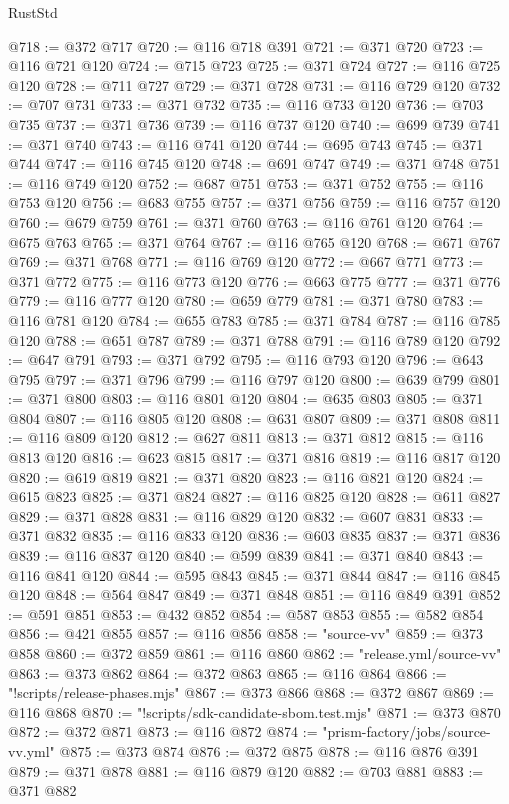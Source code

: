 \begin{lexlean}{RustStd}
\begin{coremodule}
@718 := @372 @717
@720 := @116 @718 @391
@721 := @371 @720
@723 := @116 @721 @120
@724 := @715 @723
@725 := @371 @724
@727 := @116 @725 @120
@728 := @711 @727
@729 := @371 @728
@731 := @116 @729 @120
@732 := @707 @731
@733 := @371 @732
@735 := @116 @733 @120
@736 := @703 @735
@737 := @371 @736
@739 := @116 @737 @120
@740 := @699 @739
@741 := @371 @740
@743 := @116 @741 @120
@744 := @695 @743
@745 := @371 @744
@747 := @116 @745 @120
@748 := @691 @747
@749 := @371 @748
@751 := @116 @749 @120
@752 := @687 @751
@753 := @371 @752
@755 := @116 @753 @120
@756 := @683 @755
@757 := @371 @756
@759 := @116 @757 @120
@760 := @679 @759
@761 := @371 @760
@763 := @116 @761 @120
@764 := @675 @763
@765 := @371 @764
@767 := @116 @765 @120
@768 := @671 @767
@769 := @371 @768
@771 := @116 @769 @120
@772 := @667 @771
@773 := @371 @772
@775 := @116 @773 @120
@776 := @663 @775
@777 := @371 @776
@779 := @116 @777 @120
@780 := @659 @779
@781 := @371 @780
@783 := @116 @781 @120
@784 := @655 @783
@785 := @371 @784
@787 := @116 @785 @120
@788 := @651 @787
@789 := @371 @788
@791 := @116 @789 @120
@792 := @647 @791
@793 := @371 @792
@795 := @116 @793 @120
@796 := @643 @795
@797 := @371 @796
@799 := @116 @797 @120
@800 := @639 @799
@801 := @371 @800
@803 := @116 @801 @120
@804 := @635 @803
@805 := @371 @804
@807 := @116 @805 @120
@808 := @631 @807
@809 := @371 @808
@811 := @116 @809 @120
@812 := @627 @811
@813 := @371 @812
@815 := @116 @813 @120
@816 := @623 @815
@817 := @371 @816
@819 := @116 @817 @120
@820 := @619 @819
@821 := @371 @820
@823 := @116 @821 @120
@824 := @615 @823
@825 := @371 @824
@827 := @116 @825 @120
@828 := @611 @827
@829 := @371 @828
@831 := @116 @829 @120
@832 := @607 @831
@833 := @371 @832
@835 := @116 @833 @120
@836 := @603 @835
@837 := @371 @836
@839 := @116 @837 @120
@840 := @599 @839
@841 := @371 @840
@843 := @116 @841 @120
@844 := @595 @843
@845 := @371 @844
@847 := @116 @845 @120
@848 := @564 @847
@849 := @371 @848
@851 := @116 @849 @391
@852 := @591 @851
@853 := @432 @852
@854 := @587 @853
@855 := @582 @854
@856 := @421 @855
@857 := @116 @856
@858 := "source-vv"
@859 := @373 @858
@860 := @372 @859
@861 := @116 @860
@862 := "release.yml/source-vv"
@863 := @373 @862
@864 := @372 @863
@865 := @116 @864
@866 := "!scripts/release-phases.mjs"
@867 := @373 @866
@868 := @372 @867
@869 := @116 @868
@870 := "!scripts/sdk-candidate-sbom.test.mjs"
@871 := @373 @870
@872 := @372 @871
@873 := @116 @872
@874 := "prism-factory/jobs/source-vv.yml"
@875 := @373 @874
@876 := @372 @875
@878 := @116 @876 @391
@879 := @371 @878
@881 := @116 @879 @120
@882 := @703 @881
@883 := @371 @882

\end{coremodule}
\end{lexlean}
